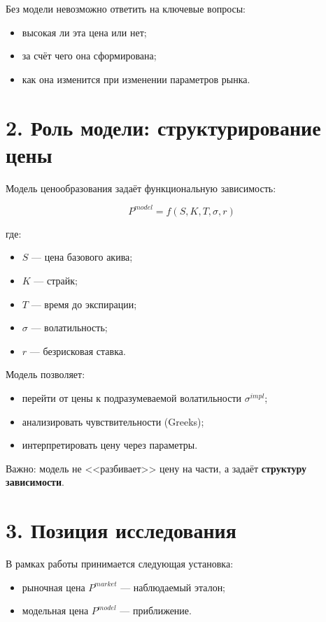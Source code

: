 \documentclass[12pt]{article}
\begin{document}
Без модели невозможно ответить на ключевые вопросы:

\begin{itemize}
    \item высокая ли эта цена или нет;
    \item за счёт чего она сформирована;
    \item как она изменится при изменении параметров рынка.
\end{itemize}

\section*{2. Роль модели: структурирование цены}

Модель ценообразования задаёт функциональную зависимость:

\[
P^{model} = f(S, K, T, \sigma, r)
\]

где:

\begin{itemize}
    \item \(S\) --- цена базового акива;
    \item \(K\) --- страйк;
    \item \(T\) --- время до экспирации;
    \item \(\sigma\) --- волатильность;
    \item \(r\) --- безрисковая ставка.
\end{itemize}

Модель позволяет:

\begin{itemize}
    \item перейти от цены к подразумеваемой волатильности \(\sigma^{impl}\);
    \item анализировать чувствительности (Greeks);
    \item интерпретировать цену через параметры.
\end{itemize}

Важно: модель не <<разбивает>> цену на части, а задаёт \textbf{структуру зависимости}.

\section*{3. Позиция исследования}

В рамках работы принимается следующая установка:

\begin{itemize}
    \item рыночная цена \(P^{market}\) --- наблюдаемый эталон;
    \item модельная цена \(P^{model}\) --- приближение.
\end{itemize}
\end{document}
